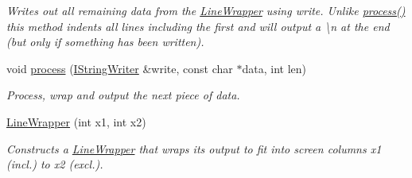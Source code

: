 \begin{DoxyCompactItemize}
\begin{DoxyCompactList}\small\item\em Writes out all remaining data from the \hyperlink{classxmem_1_1config_1_1third__party_1_1_print_usage_implementation_1_1_line_wrapper}{Line\-Wrapper} using {\ttfamily write}. Unlike \hyperlink{classxmem_1_1config_1_1third__party_1_1_print_usage_implementation_1_1_line_wrapper_ad8bdb1f9269d88487105199d23bb641f}{process()} this method indents all lines including the first and will output a \textbackslash{}n at the end (but only if something has been written). \end{DoxyCompactList}\item 
void \hyperlink{classxmem_1_1config_1_1third__party_1_1_print_usage_implementation_1_1_line_wrapper_ad8bdb1f9269d88487105199d23bb641f}{process} (\hyperlink{structxmem_1_1config_1_1third__party_1_1_print_usage_implementation_1_1_i_string_writer}{I\-String\-Writer} \&write, const char $\ast$data, int len)
\begin{DoxyCompactList}\small\item\em Process, wrap and output the next piece of data. \end{DoxyCompactList}\item 
\hyperlink{classxmem_1_1config_1_1third__party_1_1_print_usage_implementation_1_1_line_wrapper_a17ff253c8a833dc8547f98999ac2a5c6}{Line\-Wrapper} (int x1, int x2)
\begin{DoxyCompactList}\small\item\em Constructs a \hyperlink{classxmem_1_1config_1_1third__party_1_1_print_usage_implementation_1_1_line_wrapper}{Line\-Wrapper} that wraps its output to fit into screen columns {\ttfamily x1} (incl.) to {\ttfamily x2} (excl.). \end{DoxyCompactList}\end{DoxyCompactItemize}


